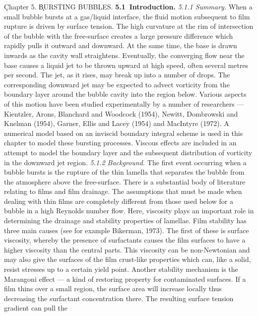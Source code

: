 \vbox{
\c{\bigrmb Chapter 5.}
\vskip 1cm
\c{\bigrm BURSTING BUBBLES.}
\vskip 15pt
\hbox{\bf 5.1 Introduction.}
\vskip 5pt
} 
\c{\it 5.1.1 Summary.}
\vskip 5pt
When a small bubble bursts at a gas/liquid interface,
the fluid motion subsequent to film rupture is
driven by surface tension. The 
high curvature at the rim of intersection of the bubble with the
free-surface creates a large pressure difference
which rapidly pulls it outward and downward. 
At the same time, the base is drawn inwards as
the cavity wall straightens. Eventually, the converging flow near the
base causes a liquid jet to be thrown upward at high speed,
often several metres per second. 
The jet, as it rises, may break up into a number of drops. The corresponding
downward jet may be expected to advect vorticity from the boundary
layer around the bubble cavity into the region below.
Various aspects of this motion have been studied experimentally
by a number of researchers --- Kientzler, Arons, Blanchard and Woodcock (1954),
Newitt, Dombrowski and Knelman (1954), Garner, Ellis and Lacey (1954)
and MacIntyre (1972).
A numerical model based on an inviscid boundary integral 
scheme is used in this chapter to model these bursting processes. 
Viscous effects are included in an attempt to model the 
boundary layer and the subsequent distribution of vorticity in the
downward jet region.
\vskip 15pt
\c {\it 5.1.2 Background.}
\vskip 5pt
The first event occurring when a bubble bursts is the rupture of the
thin lamella that separates the bubble from the atmosphere above
the free-surface.
There is a substantial body of literature relating to films
and film drainage. The assumptions
that must be made when dealing with thin films are completely 
different from those used below for a bubble in a high Reynolds 
number flow. Here, viscosity plays an important role in 
determining the drainage and stability properties of lamellae.
Film stability has three main causes (see for example 
Bikerman, 1973). 
The first of these is
surface viscosity, whereby the presence of surfactants causes the
film surfaces to have a higher viscosity than the central parts.
This viscosity can be non-Newtonian and may also give the surfaces of the 
film crust-like properties which can, like a solid,
resist stresses up to a certain yield point. Another stability mechanism
is the Marangoni effect --- a kind of restoring property for
contaminated surfaces. If a film thins over a small region, the 
surface area will increase locally thus decreasing the surfactant
concentration there. The resulting surface tension gradient can pull the 
